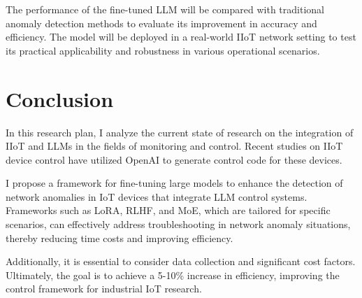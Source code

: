 \documentclass[usenatbib]{tjaa}
\begin{document}
The performance of the fine-tuned LLM will be compared with traditional anomaly detection methods to
evaluate its improvement in accuracy and efficiency.
The model will be deployed in a real-world IIoT network setting to test its practical
applicability and robustness in various operational scenarios.

\section{Conclusion}
In this research plan, I analyze the current state of research on the integration
of IIoT and LLMs in the fields of monitoring and control.
Recent studies on IIoT device control have utilized OpenAI
to generate control code for these devices.

I propose a framework for fine-tuning large models to
enhance the detection of network anomalies in IoT devices
that integrate LLM control systems. Frameworks such as LoRA,
RLHF, and MoE, which are tailored for specific scenarios,
can effectively address troubleshooting in network anomaly
situations, thereby reducing time costs and improving efficiency.

Additionally, it is essential to consider data collection and
significant cost factors. Ultimately, the goal is to achieve a
5-10\% increase in efficiency, improving the control framework
for industrial IoT research.





\label{lastpage}
\end{document}
